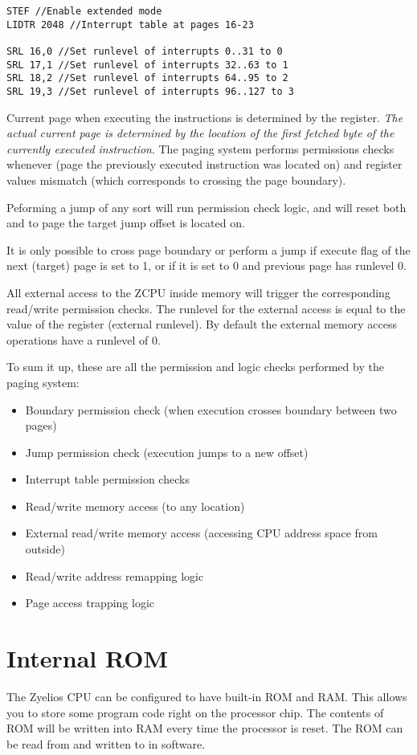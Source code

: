 \begin{verbatim}
STEF //Enable extended mode
LIDTR 2048 //Interrupt table at pages 16-23

SRL 16,0 //Set runlevel of interrupts 0..31 to 0
SRL 17,1 //Set runlevel of interrupts 32..63 to 1
SRL 18,2 //Set runlevel of interrupts 64..95 to 2
SRL 19,3 //Set runlevel of interrupts 96..127 to 3
\end{verbatim}

Current page when executing the instructions is determined by the  register. \emph{The actual current page is determined by the location of the first fetched byte of the currently executed instruction}. The paging system performs permissions checks whenever  (page the previously executed instruction was located on) and  register values mismatch (which corresponds to crossing the page boundary).

Peforming a jump of any sort will run permission check logic, and will reset both  and  to page the target jump offset is located on.

It is only possible to cross page boundary or perform a jump if execute flag of the next (target) page is set to 1, or if it is set to 0 and previous page has runlevel 0.

All external access to the ZCPU inside memory will trigger the corresponding read/write permission checks. The runlevel for the external access is equal to the value of the  register (external runlevel). By default the external memory access operations have a runlevel of 0.

To sum it up, these are all the permission and logic checks performed by the paging system:
\begin{itemize}
	\item Boundary permission check (when execution crosses boundary between two pages)
	\item Jump permission check (execution jumps to a new offset)
  \item Interrupt table permission checks	
	\item Read/write memory access (to any location)
	\item External read/write memory access (accessing CPU address space from outside)	
	\item Read/write address remapping logic
	\item Page access trapping logic
\end{itemize}

\section{Internal ROM}
The Zyelios CPU can be configured to have built-in ROM and RAM. This allows you to store some program code right on the processor chip. The contents of ROM will be written into RAM every time the processor is reset. The ROM can be read from and written to in software.

